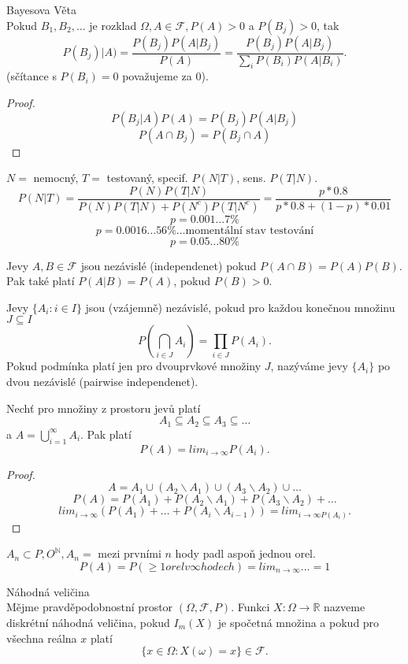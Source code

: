 \documentclass[../main.tex]{subfiles}
\begin{document}
\begin{definition}
    Bayesova Věta\\
    Pokud $B_1,B_2,\dots $ je rozklad $\Omega, A \in \mathcal{F}, P(A) > 0$ a $P(B_j) > 0$, tak
    \[P(B_j)| A) = \frac{P(B_j)P(A|B_j)}{P(A)} = \frac{P(B_j)P(A|B_j)}{\sum_i P(B_i)P(A|B_i)}.\]
    (sčítance s $P(B_i) = 0$ považujeme za $0$).
    
    \begin{proof}
        \[P(B_j | A)P(A) = P(B_j)P(A|B_j)\]
        \[P(A\cap B_j) = P(B_j \cap A)\]
    \end{proof}
\end{definition}
\begin{example}
    $N=$ nemocný, $T=$ testovaný, specif. $P(N|T)$, sens. $P(T|N)$.
    \[P(N|T) = \frac{P(N)P(T|N)}{P(N)P(T|N)+ P(N^c)P(T|N^c)} = \frac{p*0.8}{p*0.8 + (1-p)*0.01}\]
    \[p = 0.001 \dots 7\%\]
    \[p = 0.0016 \dots 56\% \dots \text{momentální stav testování}\]
    \[p = 0.05 \dots 80\%\] 
\end{example}

\begin{definition}
    Jevy $A,B \in \mathcal{F}$ jsou nezávislé (independenet) pokud $P(A\cap B) = P(A)P(B)$.\\
    Pak také platí $P(A|B) = P(A)$, pokud $P(B)>0$.
\end{definition}

\begin{definition}
    Jevy $\{A_i : i \in I\}$ jsou (vzájemně) nezávislé, pokud pro každou konečnou množinu $J \subseteq I$
    \[P(\bigcap_{i\in J} A_i) = \prod_{i\in J} P(A_i).\]
    Pokud podmínka platí jen pro dvouprvkové množiny $J$, nazýváme jevy $\{A_i\}$ po dvou nezávislé (pairwise independenet).
\end{definition}
\begin{definition}
    Nechť pro množiny z prostoru jevů platí
    \[A_1 \subseteq A_2 \subseteq A_3 \subseteq \dots\]
    a $A = \bigcup^\infty_{i=1}A_i$. Pak platí
    \[P(A) = lim_{i\rightarrow \infty} P(A_i).\]
    \begin{proof}
        \[A = A_1 \cup (A_2\backslash A_1)\cup (A_3\backslash A_2) \cup \dots\]
        \[P(A) = P(A_1) + P(A_2\backslash A_1) + P(A_3\backslash A_2) + \dots\]
        \[lim_{i\rightarrow \infty} (P(A_1) + \dots + P(A_i \backslash A_{i-1})) = lim_{i\rightarrow \infty P(A_i)}.\]
    \end{proof}
 
    $A_n \subset {P,O}^\mathbb{N}, A_n = $ mezi prvními $n$ hody padl aspoň jednou orel.
    \[P(A) = P(\geq 1 orel v \infty hodech) = lim_{n\rightarrow \infty} \dots = 1\]
\end{definition}
\begin{definition}
    Náhodná veličina\\
    
    Mějme pravděpodobnostní prostor $(\Omega, \mathcal{F}, P).$ Funkci $X : \Omega \rightarrow \mathbb{R}$
    nazveme diskrétní náhodná veličina, pokud $I_m(X)$ je spočetná množina a pokud pro všechna reálna $x$ platí
    \[\{x \in \Omega : X(\omega) = x\} \in \mathcal{F}.\]
\end{definition}
\end{document}
